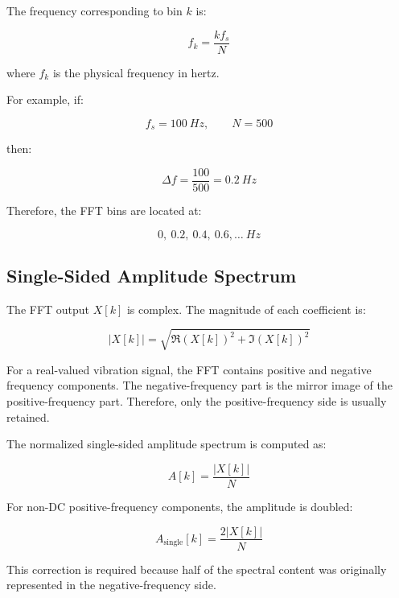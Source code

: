 \documentclass[11pt,a4paper]{article}
\begin{document}
The frequency corresponding to bin \(k\) is:

\begin{equation}
    f_k = \frac{k f_s}{N}
\end{equation}

where \(f_k\) is the physical frequency in hertz.

For example, if:

\begin{equation}
    f_s = 100 \ \si{Hz}, \qquad N = 500
\end{equation}

then:

\begin{equation}
    \Delta f = \frac{100}{500} = 0.2 \ \si{Hz}
\end{equation}

Therefore, the FFT bins are located at:

\begin{equation}
    0,\ 0.2,\ 0.4,\ 0.6,\dots \ \si{Hz}
\end{equation}

\subsection{Single-Sided Amplitude Spectrum}

The FFT output \(X[k]\) is complex. The magnitude of each coefficient is:

\begin{equation}
    |X[k]| = \sqrt{\Re(X[k])^2 + \Im(X[k])^2}
\end{equation}

For a real-valued vibration signal, the FFT contains positive and negative frequency components. The negative-frequency part is the mirror image of the positive-frequency part. Therefore, only the positive-frequency side is usually retained.

The normalized single-sided amplitude spectrum is computed as:

\begin{equation}
    A[k] = \frac{|X[k]|}{N}
\end{equation}

For non-DC positive-frequency components, the amplitude is doubled:

\begin{equation}
    A_{\text{single}}[k] =
    \frac{2|X[k]|}{N}
\end{equation}

This correction is required because half of the spectral content was originally represented in the negative-frequency side.
\end{document}
